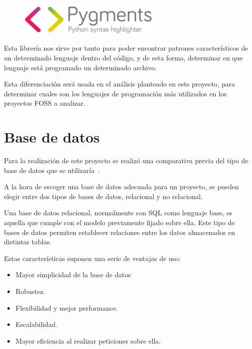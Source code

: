 \documentclass[a4paper, spanish, 12pt]{book}
\begin{document}
\begin{figure}[H]
  \centering
  \includegraphics[width=7cm, keepaspectratio]{img/pygments-logo}
\end{figure}

Esta librer\'ia nos sirve por tanto para poder encontrar patrones caracter\'isticos
de un determinado lenguaje dentro del c\'odigo, y de esta forma, determinar en que
lenguaje est\'a programado un determinado archivo.

Esta diferenciaci\'on ser\'a usada en el an\'alisis planteado en este proyecto,
para determinar cuales son los lenguajes de programaci\'on m\'as utilizados
en los proyectos FOSS a analizar.

\section{Base de datos}
\label{sec:database}

Para la realizaci\'on de este proyecto se realiz\'o una comparativa previa del
tipo de base de datos que se utilizar\'ia~\cite{sqlvsnosql}.

A la hora de escoger una base de datos adecuada para un proyecto, se pueden
elegir entre dos tipos de bases de datos, relacional y no relacional.

Una base de datos relacional, normalmente con SQL como lenguaje base, es aquella
que cumple con el modelo previamente fijado sobre ella. Este tipo de bases de datos
permiten establecer relaciones entre los datos almacenados en distintas tablas.

Estas caracter\'isticas suponen una serie de ventajas de uso:

\begin{itemize}

\item Mayor simplicidad de la base de datos

\item Robustez.

\item Flexibilidad y mejor performance.

\item Escalabilidad.

\item Mayor eficiencia al realizar peticiones sobre ella.

\end{itemize}
\end{document}
